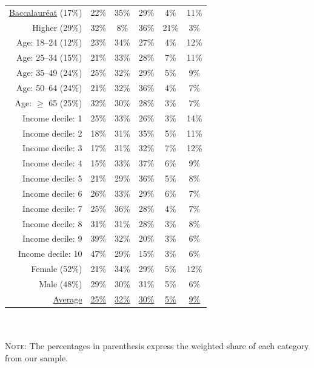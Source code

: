 \documentclass[english,5p,authoryear]{elsarticle}
\begin{document}
\begin{appendices}
\begin{spacing}{1.8}
\begin{table}[ht]
{\begin{tabular}{rccccc}
  \uline{Baccalauréat} (17\%) & 22\% & 35\% & 29\% & 4\% & 11\% \\ 
  Higher (29\%) & 32\% & 8\% & 36\% & 21\% & 3\% \\
  \hline
  Age: 18--24 (12\%) & 23\% & 34\% & 27\% & 4\% & 12\% \\ 
  Age: 25--34 (15\%) & 21\% & 33\% & 28\% & 7\% & 11\% \\ 
  Age: 35--49 (24\%) & 25\% & 32\% & 29\% & 5\% & 9\% \\ 
  Age: 50--64 (24\%) & 21\% & 32\% & 36\% & 4\% & 7\% \\ 
  Age: $\geq$ 65 (25\%) & 32\% & 30\% & 28\% & 3\% & 7\% \\
  \hline
  Income decile: 1 & 25\% & 33\% & 26\% & 3\% & 14\% \\ 
  Income decile: 2 & 18\% & 31\% & 35\% & 5\% & 11\% \\
  Income decile: 3 & 17\% & 31\% & 32\% & 7\% & 12\% \\
  Income decile: 4 & 15\% & 33\% & 37\% & 6\% & 9\% \\
  Income decile: 5 & 21\% & 29\% & 36\% & 5\% & 8\% \\
  Income decile: 6 & 26\% & 33\% & 29\% & 6\% & 7\% \\
  Income decile: 7 & 25\% & 36\% & 28\% & 4\% & 7\% \\
  Income decile: 8 & 31\% & 31\% & 28\% & 3\% & 8\% \\
  Income decile: 9 & 39\% & 32\% & 20\% & 3\% & 6\% \\
  Income decile: 10 & 47\% & 29\% & 15\% & 3\% & 6\% \\
  \hline
  Female (52\%) & 21\% & 34\% & 29\% & 5\% & 12\% \\
  Male (48\%) & 29\% & 30\% & 31\% & 5\% & 6\% \\
  \hline
  \uline{Average} & \uline{25\%} & \uline{32\%} & \uline{30\%} & \uline{5\%} & \uline{9\%} \\ 
   \hline \hline
\end{tabular}
}
\\ $\quad$ \\
{\footnotesize \textsc{Note:} The percentages in parenthesis express the weighted share of each category from our sample.}
\label{tab:gilets_jaunes_agglo}
\end{table}
%
\end{spacing}




\end{appendices}
%
%
\end{document}
